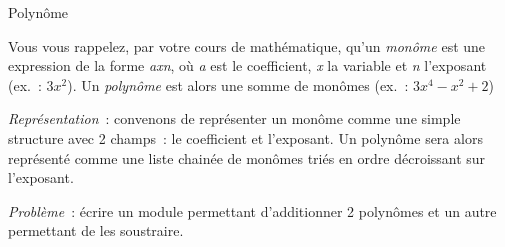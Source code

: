 	\begin{Exercice}{Polynôme}
	
		Vous vous rappelez, par votre cours de mathématique, 
		qu'un \textit{monôme} est une expression de la forme
		\textit{ax}\textit{n}, où \textit{a} 
		est le coefficient, \textit{x} la variable et \textit{n}
		l'exposant (ex.~: $3x^2$). Un \textit{polynôme} est alors 
		une somme de monômes (ex.~: $3x^4-x^2+2$)

		\textit{Représentation}~: convenons de représenter un monôme 
		comme une simple structure avec 2 champs~: le coefficient
		et l'exposant. Un polynôme sera alors représenté comme une 
		liste chainée de monômes triés en ordre décroissant sur
		l'exposant.

		\textit{Problème}~: écrire un module permettant d'additionner 2 polynômes 
		et un autre permettant de les soustraire.
	\end{Exercice}

